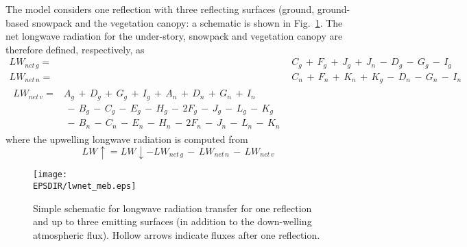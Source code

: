 The model considers one reflection with three reflecting surfaces (ground, 
ground-based snowpack and the vegetation canopy: a schematic is shown
in Fig.~\ref{fig:meb_lwsnow_vg}. 
%
The net longwave radiation for the under-story, snowpack and vegetation canopy are therefore defined, 
respectively, as
%
\begin{subequations}\label{eq:meb_lw_gn_terms}
\begin{align}
 \label{eq:meb_lw_net_gn}
LW_{net\,g} =& C_{g} \,+\, F_{g} \,+\, J_{g}\,+\, J_{n}
\,-\,D_{g} \,-\, G_{g} \,-\, I_{g}
\\
 \label{eq:meb_lw_net_nn}
LW_{net\,n} =& C_{n} \,+\, F_{n} \,+\, K_{n}\,+\, K_{g}
\,-\,D_{n} \,-\, G_{n} \,-\, I_{n}
\\
 \label{eq:meb_lw_net_vn}
\begin{split}
LW_{net\,v} =& A_{g} \,+\, D_{g} \,+\, G_{g} \,+\, I_{g}
\,+\, A_{n} \,+\, D_{n} \,+\, G_{n} \,+\, I_{n}
\\
& \,-\, B_{g} \,-\, C_{g}\,-\, E_{g} \,-\, H_{g} \,-\, 2F_{g} \,-\, J_{g} \,-\, L_{g}\,-\, K_{g}
\\
&\,-\, B_{n} \,-\, C_{n}\,-\, E_{n} \,-\, H_{n} \,-\, 2F_{n} \,-\, J_{n} \,-\, L_{n}\,-\, K_{n}
%
\end{split}
\end{align}
\end{subequations}
%
where the upwelling longwave radiation is computed from
%
\begin{equation}
\label{eq:meb_lwup_gvn}
%
LW\uparrow = LW\downarrow - LW_{net\,g} \,-\, LW_{net\,n} \,-\, LW_{net\,v}
%
\end{equation}
%

\begin{figure}[!b]
\centerline{
\texttt{[image: \\EPSDIR/lwnet\_meb.eps]}}
\caption{Simple schematic for longwave radiation transfer for one
reflection and up to three emitting surfaces (in addition to the
down-welling atmospheric flux). Hollow arrows indicate
fluxes after one reflection.}
\label{fig:meb_lwsnow_vg}
\end{figure}



